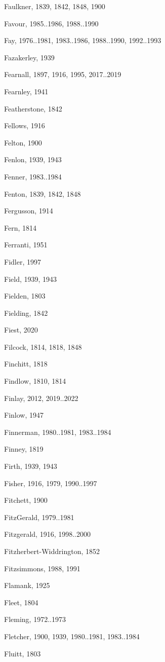 {\begin{theindex}
\item Faulkner, 1839, 1842, 1848, 1900
\item Favour, 1985..1986, 1988..1990
\item Fay, 1976..1981, 1983..1986, 1988..1990, 1992..1993
\item Fazakerley, 1939
\item Fearnall, 1897, 1916, 1995, 2017..2019
\item Fearnley, 1941
\item Featherstone, 1842
\item Fellows, 1916
\item Felton, 1900
\item Fenlon, 1939, 1943
\item Fenner, 1983..1984
\item Fenton, 1839, 1842, 1848
\item Fergusson, 1914
\item Fern, 1814
\item Ferranti, 1951
\item Fidler, 1997
\item Field, 1939, 1943
\item Fielden, 1803
\item Fielding, 1842
\item Fiest, 2020
\item Filcock, 1814, 1818, 1848
\item Finchitt, 1818
\item Findlow, 1810, 1814
\item Finlay, 2012, 2019..2022
\item Finlow, 1947
\item Finnerman, 1980..1981, 1983..1984
\item Finney, 1819
\item Firth, 1939, 1943
\item Fisher, 1916, 1979, 1990..1997
\item Fitchett, 1900
\item FitzGerald, 1979..1981
\item Fitzgerald, 1916, 1998..2000
\item Fitzherbert-Widdrington, 1852
\item Fitzsimmons, 1988, 1991
\item Flamank, 1925
\item Fleet, 1804
\item Fleming, 1972..1973
\item Fletcher, 1900, 1939, 1980..1981, 1983..1984
\item Fluitt, 1803

\end{theindex}}
